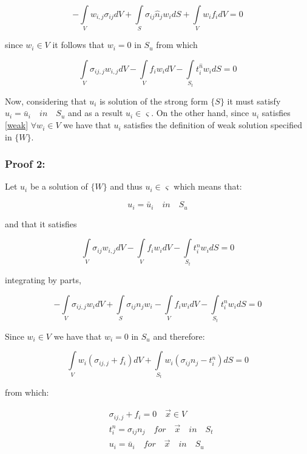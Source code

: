 \[ - \int\limits_V {{w_{i,j}}{\sigma _{ij}}dV}  + \int\limits_S {{\sigma _{ij}}{{\hat n}_j}{w_i}dS}  + \int\limits_V {{w_i}{f_i}dV = 0} \]

since $w_i \in V$ it follows that $w_i = 0$ in $S_u$ from which

\begin{equation}\label{weak}
\int\limits_V {{\sigma _{ij,j}}{w_{i,j}}dV - \int\limits_V {{f_i}{w_i}dV}  - \int\limits_{{S_t}} {t_i^{\hat n}} } {w_i}dS = 0
\end{equation}


Now, considering that $u_i$ is solution of the strong form $\{S\}$ it must satisfy $u_i = \bar u_{i} \quad in \quad S_u$ and as a result $u_i \in \varsigma$. On the other hand, since $u_i$ satisfies \cref{weak} $\forall {w_i} \in V$ we have that $u_i$ satisfies the definition of weak solution specified in $\{ W \}$.

\subsubsection*{Proof 2:}
Let $u_i$ be a solution of $\{W\}$ and thus $u_i \in \varsigma$ which means that:

\[u_i = \bar u_{i} \quad in \quad S_u\]

and that it satisfies

\[\int\limits_V {{\sigma _{ij}}{w_{i,j}}dV - \int\limits_V {{f_i}{w_i}dV - \int\limits_{{S_t}} {t_i^n} } } {w_i}dS = 0\]

integrating by parts,

\[ - \int\limits_V {{\sigma _{ij,j}}{w_i}dV + \int\limits_S {{\sigma _{ij}}{n_j}{w_i}}  - \int\limits_V {{f_i}{w_i}dV - \int\limits_{{S_t}} {t_i^n} } } {w_i}dS = 0\]

Since ${w_i} \in V$ we have that ${w_i}=0$ in $S_u$ and therefore:


\[\int\limits_V {{w_i}\left( {{\sigma _{ij,j}} + {f_i}} \right)dV + \int\limits_{{S_t}} {{w_i}\left( {{\sigma _{ij}}{n_j} - t_i^n} \right)dS = 0} } \]

from which:

\begin{equation} \label{equil_2}
\begin{split}
&{\sigma _{ij,j}} + {f_i} = 0 \quad \vec{x} \in V \\
&t_i^n = {\sigma _{ij}}{n_j} \quad for \quad \vec{x} \quad in \quad S_t\\
&{u_i} = {{\bar u}_i} \quad for \quad \vec{x} \quad in \quad S_u
\end{split}
\end{equation}

